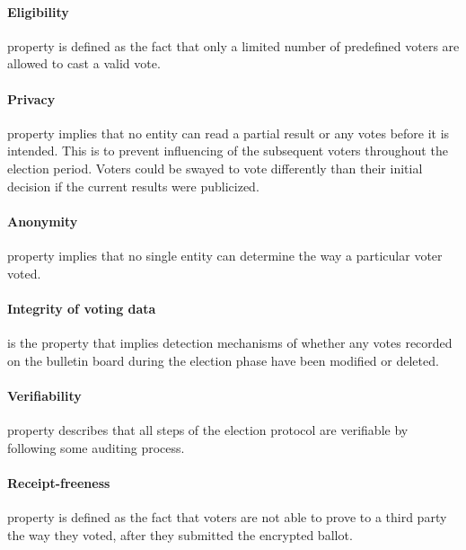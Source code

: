 \paragraph{Eligibility} property is defined as the fact that only a limited number of predefined voters are allowed to cast a valid vote. 

\paragraph{Privacy} property implies that no entity can read a partial result or any votes before it is intended. This is to prevent influencing of the subsequent voters throughout the election period. Voters could be swayed to vote differently than their initial decision if the current results were publicized.

\paragraph{Anonymity} property implies that no single entity can determine the way a particular voter voted.

\paragraph{Integrity of voting data} is the property that implies detection mechanisms of whether any votes recorded on the bulletin board during the election phase have been modified or deleted.

\paragraph{Verifiability} property describes that all steps of the election protocol are verifiable by following some auditing process.

\paragraph{Receipt-freeness} property is defined as the fact that voters are not able to prove to a third party the way they voted, after they submitted the encrypted ballot.
